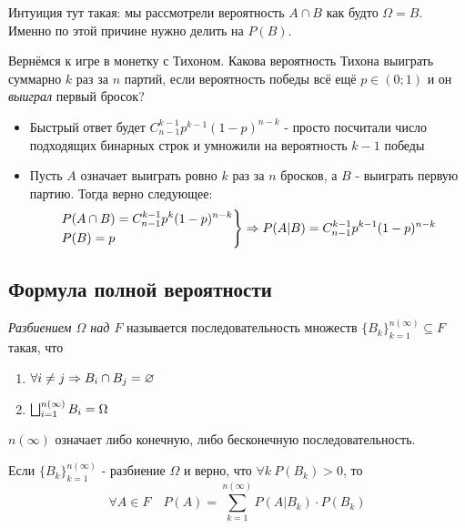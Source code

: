\begin{note}
	Интуиция тут такая: мы рассмотрели вероятность $A \cap B$ как будто $\Omega = B$. Именно по этой причине нужно делить на $P(B)$.
\end{note}

\begin{example}
	Вернёмся к игре в монетку с Тихоном. Какова вероятность Тихона выиграть суммарно $k$ раз за $n$ партий, если вероятность победы всё ещё $p \in (0; 1)$ и он \textit{выиграл} первый бросок?
	\begin{itemize}
		\item Быстрый ответ будет $C_{n - 1}^{k - 1} p^{k - 1} (1 - p)^{n - k}$ - просто посчитали число подходящих бинарных строк и умножили на вероятность $k - 1$ победы
		
		\item Пусть $A$ означает выиграть ровно $k$ раз за $n$ бросков, а $B$ - выиграть первую партию. Тогда верно следующее:
		\[
			\left.\begin{aligned}
				&{P(A \cap B) = C_{n - 1}^{k - 1} p^k (1 - p)^{n - k}} 
				\\
				&{P(B) = p}
			\end{aligned}\right\}
			\Rightarrow P(A|B) = C_{n - 1}^{k - 1} p^{k - 1} (1 - p)^{n - k}
		\]
	\end{itemize}
\end{example}

\subsection{Формула полной вероятности}

\begin{definition}
	\textit{Разбиением $\Omega$ над $F$} называется последовательность множеств $\{B_k\}_{k = 1}^{n(\infty)} \subseteq F$ такая, что
	\begin{enumerate}
		\item $\forall i \neq j \Rightarrow B_i \cap B_j = \varnothing$
		
		\item $\bigsqcup_{i = 1}^{n (\infty)} B_i = \Omega$
	\end{enumerate}
\end{definition}

\begin{note}
	$n(\infty)$ означает либо конечную, либо бесконечную последовательность.
\end{note}

\begin{theorem}
	Если $\{B_k\}_{k = 1}^{n(\infty)}$ - разбиение $\Omega$ и верно, что $\forall k\ P(B_k) > 0$, то
	\[
		\forall A \in F \quad P(A) = \sum_{k = 1}^{n(\infty)} P(A|B_k) \cdot P(B_k)
	\]
\end{theorem}

